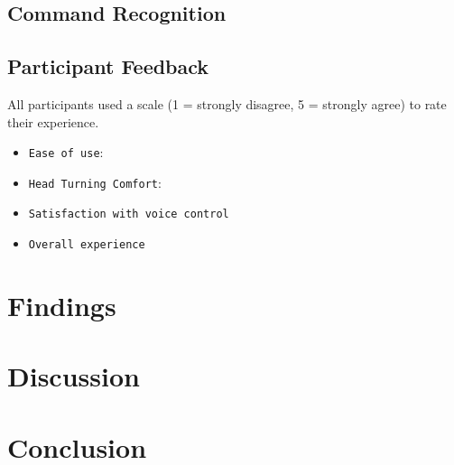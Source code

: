 \documentclass[manuscript, screen, review]{acmart}
\begin{document}
\subsection{Command Recognition}

\subsection{Participant Feedback}
All participants used a scale (1 = strongly disagree, 5 = strongly agree) to rate their experience.
\begin{itemize}
\item {\texttt{Ease of use}}: 
\item {\texttt{Head Turning Comfort}}:
\item {\texttt{Satisfaction with voice control}}
\item {\texttt{Overall experience}}
\end{itemize}
\section{Findings}
\section{Discussion}
\section{Conclusion}



\end{document}
